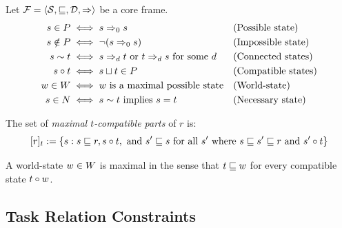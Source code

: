 \documentclass[../LogosReference.tex]{subfiles}
\begin{document}
\begin{definition}\label{def:state-modality}
	Let $\mathcal{F} = \langle \mathcal{S}, \sqsubseteq, \mathcal{D}, \Rightarrow \rangle$ be a core frame.
	\begin{align}
		s \in P    & \iff s \Rightarrow_{0} s                                                &  & \text{(Possible state)}    \\
		s \notin P & \iff \neg(s \Rightarrow_{0} s)                                          &  & \text{(Impossible state)}  \\
		s \sim t     & \iff s \Rightarrow_{d} t \text{ or } t \Rightarrow_{d} s \text{ for some } d &  & \text{(Connected states)}  \\
		s \circ t    & \iff s\sqcup t \in P                                   &  & \text{(Compatible states)} \\
		w \in W & \iff w \text{ is a maximal possible state}                         &  & \text{(World-state)}       \\
		s \in N   & \iff s \sim t \text{ implies } s = t                         &  & \text{(Necessary state)}
	\end{align}
\end{definition}

\begin{definition}\label{def:maximal-compatible}
	The set of \emph{maximal $t$-compatible parts} of $r$ is:
	\[
		[r]_{t} := \{s : s \sqsubseteq r, s \circ t, \text{ and } s' \sqsubseteq s \text{ for all } s' \text{ where } s \sqsubseteq s' \sqsubseteq r \text{ and } s' \circ t\}
	\]
\end{definition}

\begin{remark}
	A world-state $w \in W$ is maximal in the sense that $t \sqsubseteq w$ for every compatible state $t \circ w$.
\end{remark}


\subsection{Task Relation Constraints}\label{sec:task-constraints}
\end{document}
